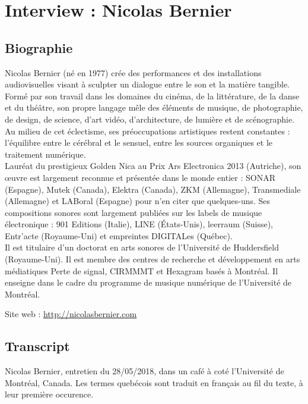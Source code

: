 \chapter{Interview : Nicolas Bernier}
\label{appendix:bernier}

\section*{Biographie}

\noindent Nicolas Bernier (né en 1977) crée des performances et des installations audiovisuelles visant à sculpter un dialogue entre le son et la matière tangible. Formé par son travail dans les domaines du cinéma, de la littérature, de la danse et du théâtre, son propre langage mêle des éléments de musique, de photographie, de design, de science, d'art vidéo, d'architecture, de lumière et de scénographie. Au milieu de cet éclectisme, ses préoccupations artistiques restent constantes : l'équilibre entre le cérébral et le sensuel, entre les sources organiques et le traitement numérique.\\
\indent Lauréat du prestigieux Golden Nica au Prix Ars Electronica 2013 (Autriche), son œuvre est largement reconnue et présentée dans le monde entier : SONAR (Espagne), Mutek (Canada), Elektra (Canada), ZKM (Allemagne), Transmediale (Allemagne) et LABoral (Espagne) pour n'en citer que quelques-uns. Ses compositions sonores sont largement publiées sur les labels de musique électronique : 901 Editions (Italie), LINE (États-Unis), leerraum (Suisse), Entr'acte (Royaume-Uni) et empreintes DIGITALes (Québec).\\
\indent Il est titulaire d'un doctorat en arts sonores de l'Université de Huddersfield (Royaume-Uni). Il est membre des centres de recherche et développement en arts médiatiques Perte de signal, CIRMMMT et Hexagram basés à Montréal. Il enseigne dans le cadre du programme de musique numérique de l'Université de Montréal.

\noindent Site web : \url{http://nicolasbernier.com}

\section*{Transcript}

\noindent Nicolas Bernier, entretien du 28/05/2018, dans un café à coté l'Université de Montréal, Canada. Les termes quebécois sont traduit en français au fil du texte, à leur première occurence.
 


